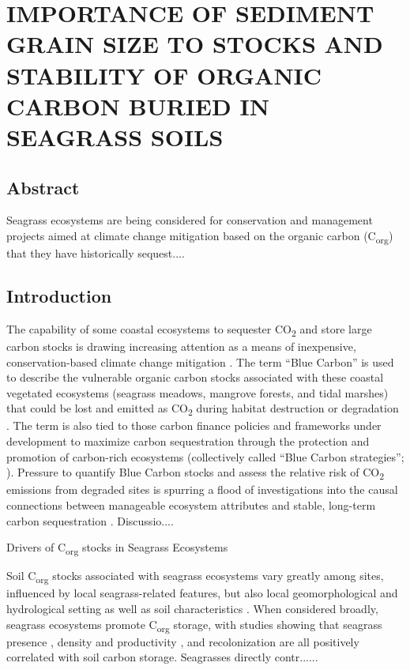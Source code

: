 \chapter{IMPORTANCE OF SEDIMENT GRAIN SIZE TO STOCKS AND STABILITY OF ORGANIC CARBON BURIED IN SEAGRASS SOILS}		\label{another chapter}

\section{Abstract}
Seagrass ecosystems are being considered for conservation and management projects aimed at climate change mitigation based on the organic carbon (C\textsubscript{org}) that they have historically sequest....

\section{Introduction}


The capability of some coastal ecosystems to sequester CO\textsubscript{2} and store large carbon stocks is drawing increasing attention as a means of inexpensive, conservation-based climate change mitigation \citep{Hiraishi:2014uo}. The term “Blue Carbon” is used to describe the vulnerable organic carbon stocks associated with these coastal vegetated ecosystems (seagrass meadows, mangrove forests, and tidal marshes) that could be lost and emitted as CO\textsubscript{2} during habitat destruction or degradation \citep{Mcleod:2011gs}. The term is also tied to those carbon finance policies and frameworks under development to maximize carbon sequestration through the protection and promotion of carbon-rich ecosystems (collectively called “Blue Carbon strategies”; \citealt{Pendleton:2012hz}). Pressure to quantify Blue Carbon stocks and assess the relative risk of CO\textsubscript{2} emissions from degraded sites is spurring a flood of investigations into the causal connections between manageable ecosystem attributes and stable, long-term carbon sequestration \citep{Howard:2017jz, Macreadie:2017dt}. Discussio....

\bigskip
\noindent Drivers of C\textsubscript{org} stocks in Seagrass Ecosystems
\medskip

Soil C\textsubscript{org} stocks associated with seagrass ecosystems vary greatly among sites, influenced by local seagrass-related features, but also local geomorphological and hydrological setting as well as soil characteristics \citep{Serrano:2016cv}. When considered broadly, seagrass ecosystems promote C\textsubscript{org} storage, with studies showing that seagrass presence \citep{Macreadie:2015hc, Mazarrasa:2015gv}, density and productivity \citep{Serrano:2014ho}, and recolonization \citep{Greiner:2013wi, Marba:2015hj} are all positively correlated with soil carbon storage. Seagrasses directly contr......

